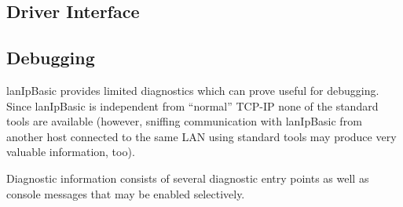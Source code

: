 \documentclass{article}
\newcommand{\lip}{lanIpBasic}
\begin{document}
  \subsection{Driver Interface}
  \subsection{Debugging}
  \lip{} provides limited diagnostics which can prove useful for
  debugging. Since \lip{} is independent from ``normal'' TCP-IP
  none of the standard tools are available (however, sniffing
  communication with \lip{} from another host connected to the
  same LAN using standard tools may produce very valuable information,
  too).

  Diagnostic information consists of several diagnostic entry
  points as well as console messages that may be enabled selectively.
\end{document}
